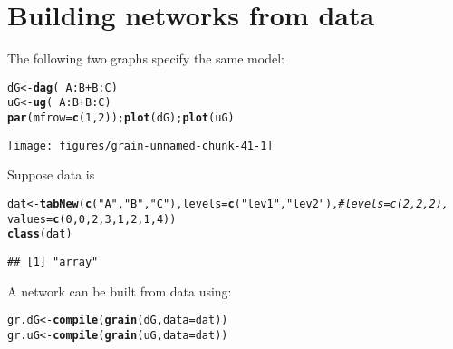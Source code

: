 \documentclass[10pt]{article}\usepackage[]{graphicx}\usepackage[]{xcolor}
\makeatletter
\def\maxwidth{ %
  \ifdim\Gin@nat@width>\linewidth
    \linewidth
  \else
    \Gin@nat@width
  \fi
}
\newcommand{\hlnum}[1]{\textcolor[rgb]{0.686,0.059,0.569}{#1}}%
\newcommand{\hlstr}[1]{\textcolor[rgb]{0.192,0.494,0.8}{#1}}%
\newcommand{\hlcom}[1]{\textcolor[rgb]{0.678,0.584,0.686}{\textit{#1}}}%
\newcommand{\hlopt}[1]{\textcolor[rgb]{0,0,0}{#1}}%
\newcommand{\hlstd}[1]{\textcolor[rgb]{0.345,0.345,0.345}{#1}}%
\newcommand{\hlkwb}[1]{\textcolor[rgb]{0.69,0.353,0.396}{#1}}%
\newcommand{\hlkwc}[1]{\textcolor[rgb]{0.333,0.667,0.333}{#1}}%
\newcommand{\hlkwd}[1]{\textcolor[rgb]{0.737,0.353,0.396}{\textbf{#1}}}%
\newenvironment{kframe}{%
 \def\at@end@of@kframe{}%
 \ifinner\ifhmode%
  \def\at@end@of@kframe{\end{minipage}}%
  \begin{minipage}{\columnwidth}%
 \fi\fi%
 \def\FrameCommand##1{\hskip\@totalleftmargin \hskip-\fboxsep
 \colorbox{shadecolor}{##1}\hskip-\fboxsep
     \hskip-\linewidth \hskip-\@totalleftmargin \hskip\columnwidth}%
 \MakeFramed {\advance\hsize-\width
   \@totalleftmargin\z@ \linewidth\hsize
   \@setminipage}}%
 {\par\unskip\endMakeFramed%
 \at@end@of@kframe}
\newenvironment{knitrout}{}{} %
\makeatother
\begin{document}
\section{Building networks from data}
\label{sec:using-textttsm-argum}

The following two graphs specify the same model:
\begin{knitrout}
\color{fgcolor}\begin{kframe}
\begin{alltt}
\hlstd{dG}  \hlkwb{<-} \hlkwd{dag}\hlstd{(}\hlopt{~}\hlstd{A}\hlopt{:}\hlstd{B} \hlopt{+} \hlstd{B}\hlopt{:}\hlstd{C)}
\hlstd{uG}  \hlkwb{<-} \hlkwd{ug}\hlstd{(}\hlopt{~}\hlstd{A}\hlopt{:}\hlstd{B} \hlopt{+} \hlstd{B}\hlopt{:}\hlstd{C)}
\hlkwd{par}\hlstd{(}\hlkwc{mfrow}\hlstd{=}\hlkwd{c}\hlstd{(}\hlnum{1}\hlstd{,}\hlnum{2}\hlstd{));} \hlkwd{plot}\hlstd{( dG );} \hlkwd{plot}\hlstd{( uG )}
\end{alltt}
\end{kframe}
\texttt{[image: figures/grain-unnamed-chunk-41-1]} 
\end{knitrout}

Suppose data is
\begin{knitrout}
\color{fgcolor}\begin{kframe}
\begin{alltt}
\hlstd{dat} \hlkwb{<-} \hlkwd{tabNew}\hlstd{(}\hlkwd{c}\hlstd{(}\hlstr{"A"}\hlstd{,} \hlstr{"B"}\hlstd{,} \hlstr{"C"}\hlstd{),} \hlkwc{levels}\hlstd{=}\hlkwd{c}\hlstd{(}\hlstr{"lev1"}\hlstd{,} \hlstr{"lev2"}\hlstd{),} \hlcom{#levels=c(2,2,2),}
              \hlkwc{values}\hlstd{=}\hlkwd{c}\hlstd{(}\hlnum{0}\hlstd{,} \hlnum{0}\hlstd{,} \hlnum{2}\hlstd{,} \hlnum{3}\hlstd{,} \hlnum{1}\hlstd{,} \hlnum{2}\hlstd{,} \hlnum{1}\hlstd{,} \hlnum{4}\hlstd{))}
\hlkwd{class}\hlstd{(dat)}
\end{alltt}
\begin{verbatim}
## [1] "array"
\end{verbatim}
\end{kframe}
\end{knitrout}

A network can be built from data using:

\begin{knitrout}
\color{fgcolor}\begin{kframe}
\begin{alltt}
\hlstd{gr.dG} \hlkwb{<-} \hlkwd{compile}\hlstd{(}\hlkwd{grain}\hlstd{( dG,} \hlkwc{data}\hlstd{=dat ))}
\hlstd{gr.uG} \hlkwb{<-} \hlkwd{compile}\hlstd{(}\hlkwd{grain}\hlstd{( uG,} \hlkwc{data}\hlstd{=dat ))}
\end{alltt}
\end{kframe}
\end{knitrout}
\end{document}
